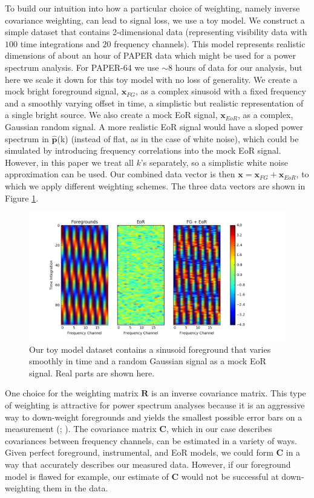 \documentclass[preprint2,numberedappendix,tighten]{aastex6}  %
\begin{document}
To build our intuition into how a particular choice of weighting, namely inverse covariance weighting, can lead to signal loss, we use a toy model. We construct a simple dataset that contains 2-dimensional data (representing visibility data with $100$ time integrations and $20$ frequency channels). This model represents realistic dimensions of about an hour of PAPER data which might be used for a power spectrum analysis. For PAPER-64 we use $\sim$$8$ hours of data for our analysis, but here we scale it down for this toy model with no loss of generality. We create a mock bright foreground signal, $\textbf{x}_{FG}$, as a complex sinusoid with a fixed frequency and a smoothly varying offset in time, a simplistic but realistic representation of a single bright source. We also create a mock EoR signal, $\textbf{x}_{EoR}$, as a complex, Gaussian random signal. A more realistic EoR signal would have a sloped power spectrum in $\hat{\textbf{p}}$(k) (instead of flat, as in the case of white noise), which could be simulated by introducing frequency correlations into the mock EoR signal. However, in this paper we treat all $k$'s separately, so a simplistic white noise approximation can be used. Our combined data vector is then $\textbf{x} = \textbf{x}_{FG} + \textbf{x}_{EoR}$, to which we apply different weighting schemes. The three data vectors are shown in Figure \ref{fig:toy_sigloss1}. 

\begin{figure}
	\centering
	\includegraphics[trim={1.5cm 0.2cm 3.5cm 0.3cm},clip,width=\columnwidth]{plots/toy_sigloss1.png}
	\caption{Our toy model dataset contains a sinusoid foreground that varies smoothly in time and a random Gaussian signal as a mock EoR signal. Real parts are shown here.}
	\label{fig:toy_sigloss1}
\end{figure}

One choice for the weighting matrix $\textbf{R}$ is an inverse covariance matrix. This type of weighting is attractive for power spectrum analyses because it is an aggressive way to down-weight foregrounds and yields the smallest possible error bars on a measurement (\citealt{tegmark_et_al1997a}; \citealt{bond_et_al1998}). The covariance matrix $\textbf{C}$, which in our case describes covariances between frequency channels, can be estimated in a variety of ways. Given perfect foreground, instrumental, and EoR models, we could form $\textbf{C}$ in a way that accurately describes our measured data. However, if our foreground model is flawed for example, our estimate of $\textbf{C}$ would not be successful at down-weighting them in the data. 
\end{document}
